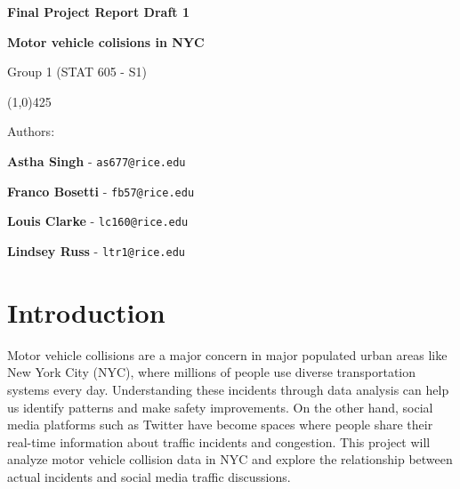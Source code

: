 \documentclass[10pt]{article}\usepackage[]{graphicx}\usepackage[]{xcolor}
\begin{document}
\begin{titlepage}
    \centering
    
    { \Huge \textbf{Final Project Report Draft 1} \par} 
    \vspace{5mm}
    { \huge \textbf{Motor vehicle colisions in NYC} \par} 
    \vspace{3mm}
    { \Large Group 1 (STAT 605 - S1)\par}  
    
    \vspace{5mm}
    \begin{center}
    \line(1,0){425}
    \end{center}
    
    \vspace{5mm}

    \vspace{15mm}
    { \large Authors: \par }
      \vspace{3mm}
    { \Large \textbf{Astha Singh} - \texttt{as677@rice.edu} \par}
    { \Large \textbf{Franco Bosetti} - \texttt{fb57@rice.edu}\par}
    { \Large \textbf{Louis Clarke} - \texttt{lc160@rice.edu}\par}
    { \Large \textbf{Lindsey Russ} - \texttt{ltr1@rice.edu}\par}    
    
    
    \vspace{5mm}
    \date{\today}
    
    \vspace{5mm}

\end{titlepage}

\newpage


\tableofcontents

\newpage

\section{Introduction}

Motor vehicle collisions are a major concern in major populated urban areas like New York City (NYC), where millions of people use diverse transportation systems every day. Understanding these incidents through data analysis can help us identify patterns and make safety improvements. On the other hand, social media platforms such as Twitter have become spaces where people share their real-time information about traffic incidents and congestion. This project will analyze motor vehicle collision data in NYC and explore the relationship between actual incidents and social media traffic discussions. 
\end{document}
